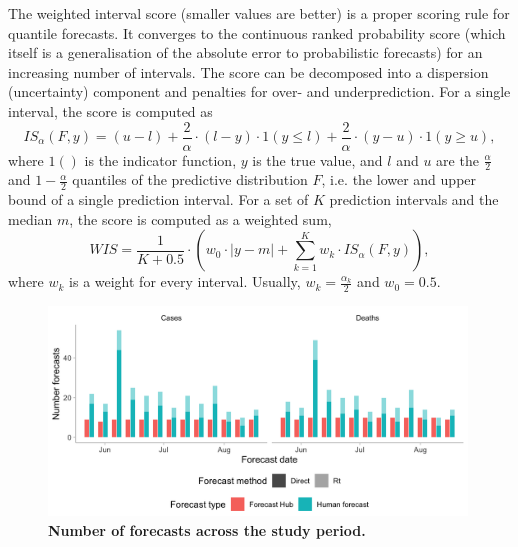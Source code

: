 \documentclass[10pt,a4paper,twocolumn]{article}
\begin{document}
The weighted interval score (smaller values are better) is a proper scoring rule for quantile forecasts. It converges to the continuous ranked probability score (which itself is a generalisation of the absolute error to probabilistic forecasts) for an increasing number of intervals. The score can be decomposed into a dispersion (uncertainty) component and penalties for over- and underprediction. For a single interval, the score is computed as 
  $$IS_\alpha(F,y) = (u-l) + \frac{2}{\alpha} \cdot (l-y) \cdot 1(y \leq l) + \frac{2}{\alpha} \cdot (y-u) \cdot 1(y \geq u), $$ 
  where $1()$ is the indicator function, $y$ is the true value, and $l$ and $u$ are the $\frac{\alpha}{2}$ and $1 - \frac{\alpha}{2}$ quantiles of the predictive distribution $F$, i.e. the lower and upper bound of a single prediction interval. For a set of $K$ prediction intervals and the median $m$, the score is computed as a weighted sum, 
  $$WIS = \frac{1}{K + 0.5} \cdot \left( w_0 \cdot |y - m| + \sum_{k = 1}^{K} w_k \cdot IS_{\alpha}(F, y) \right), $$
  where $w_k$ is a weight for every interval. Usually, $w_k = \frac{\alpha_k}{2}$ and $w_0 = 0.5$. 









\begin{figure}
\centering
\includegraphics[width=0.99\textwidth]{../output/figures/num-forecasters.png}
\caption{\bf{Number of forecasts across the study period.}}
\label{fig:num-forecasters}
\end{figure}
\end{document}
